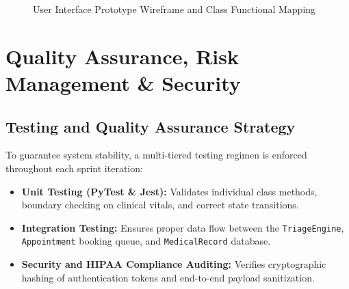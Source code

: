 \documentclass[11pt,a4paper]{article}
\begin{document}
\begin{figure}[H]
\caption{User Interface Prototype Wireframe and Class Functional Mapping}
\label{fig:ui_wireframe}
\end{figure}

\section{Quality Assurance, Risk Management \& Security}

\subsection{Testing and Quality Assurance Strategy}
To guarantee system stability, a multi-tiered testing regimen is enforced throughout each sprint iteration:
\begin{itemize}
    \item \textbf{Unit Testing (PyTest \& Jest):} Validates individual class methods, boundary checking on clinical vitals, and correct state transitions.
    \item \textbf{Integration Testing:} Ensures proper data flow between the \texttt{TriageEngine}, \texttt{Appointment} booking queue, and \texttt{MedicalRecord} database.
    \item \textbf{Security and HIPAA Compliance Auditing:} Verifies cryptographic hashing of authentication tokens and end-to-end payload sanitization.
\end{itemize}
\end{document}
